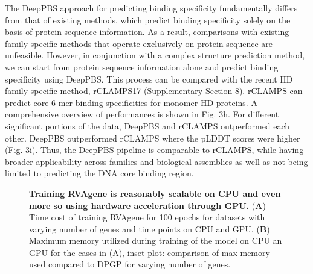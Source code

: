 The DeepPBS approach for predicting binding specificity fundamentally differs from that of existing methods, which predict binding specificity solely on the basis of protein sequence information. As a result, comparisons with existing family-specific methods that operate exclusively on protein sequence are unfeasible. However, in conjunction with a complex structure prediction method, we can start from protein sequence information alone and predict binding specificity using DeepPBS. This process can be compared with the recent HD family-specific method, rCLAMPS17 (Supplementary Section 8). rCLAMPS can predict core 6-mer binding specificities for monomer HD proteins. A comprehensive overview of performances is shown in Fig. 3h. For different significant portions of the data, DeepPBS and rCLAMPS outperformed each other. DeepPBS outperformed rCLAMPS where the pLDDT scores were higher (Fig. 3i). Thus, the DeepPBS pipeline is comparable to rCLAMPS, while having broader applicability across families and biological assemblies as well as not being limited to predicting the DNA core binding region.

\begin{center}
    \begin{figure}
        \caption[Computational cost of training RVAgene]{\textbf{Training RVAgene is reasonably scalable on CPU and even more so using hardware acceleration through GPU.} ({\bf A}) Time cost of training RVAgene for 100 epochs for datasets with varying number of genes and time points on CPU and GPU. ({\bf B}) Maximum memory utilized during training of the model on CPU an GPU for the cases in (A), inset plot: comparison of max memory used compared to DPGP for varying number of genes.}
  \label{fig:pdna3}
\end{figure}
\end{center}

